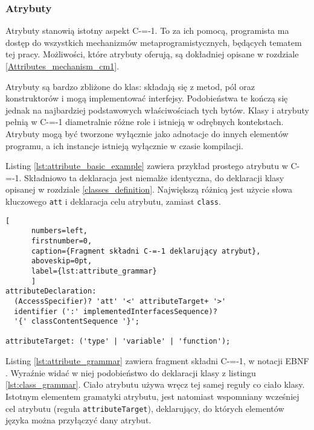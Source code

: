\subsubsection{Atrybuty}
\label{Attributes_definition}

Atrybuty stanowią istotny aspekt C-=-1.
To za ich pomocą, programista ma dostęp do wszystkich mechanizmów metaprogramistycznych, będących tematem tej pracy.
Możliwości, które atrybuty oferują, są dokładniej opisane w rozdziale \ref{Attributes_mechanism_cm1}.

Atrybuty są bardzo zbliżone do klas: składają się z metod, pól oraz konstruktorów i mogą implementować interfejsy.
Podobieństwa te kończą się jednak na najbardziej podstawowych właściwościach tych bytów.
Klasy i atrybuty pełnią w C-=-1 diametralnie różne role i istnieją w odrębnych kontekstach.
Atrybuty mogą być tworzone wyłącznie jako adnotacje do innych elementów programu, a ich instancje istnieją wyłącznie w czasie kompilacji.

Listing \ref{lst:attribute_basic_example} zawiera przykład prostego atrybutu w C-=-1.
Składniowo ta deklaracja jest niemalże identyczna, do deklaracji klasy opisanej w rozdziale \ref{classes_definition}.
Największą różnicą jest użycie słowa kluczowego \lstinline{att} i deklaracja celu atrybutu, zamiast \lstinline{class}.

\begin{minipage}{\linewidth}
  
	\begin{lstlisting}[
	  numbers=left,
	  firstnumber=0,
	  caption={Fragment składni C-=-1 deklarujący atrybut},
	  aboveskip=0pt,
	  label={lst:attribute_grammar}
	  ]
attributeDeclaration: 
  (AccessSpecifier)? 'att' '<' attributeTarget+ '>' 
  identifier (':' implementedInterfacesSequence)?
  '{' classContentSequence '}';

attributeTarget: ('type' | 'variable' | 'function');
  \end{lstlisting}
  \end{minipage}

Listing \ref{lst:attribute_grammar} zawiera fragment składni C-=-1, w notacji EBNF \cite{ebnf}.
Wyraźnie widać w niej podobieństwo do deklaracji klasy z listingu \ref{lst:class_grammar}.
Ciało atrybutu używa wręcz tej samej reguły co ciało klasy.
Istotnym elementem gramatyki atrybutu, jest natomiast wspomniany wcześniej cel atrybutu (reguła \lstinline{attributeTarget}), deklarujący, do których elementów języka można przyłączyć dany atrybut.

